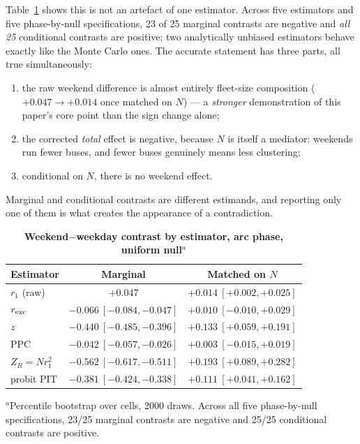 \documentclass[9pt,twocolumn,twoside]{opticajnl}
\begin{document}
Table~\ref{tab:contrasts} shows this is not an artefact of one estimator. Across five estimators
and five phase-by-null specifications, 23 of 25 marginal contrasts are negative and \emph{all
25} conditional contrasts are positive; two analytically unbiased estimators behave exactly like
the Monte Carlo ones. The accurate statement has three parts, all true simultaneously:
\begin{enumerate}\itemsep0pt
\item the raw weekend difference is almost entirely fleet-size composition ($+0.047 \to +0.014$
      once matched on $N$) --- a \emph{stronger} demonstration of this paper's core point than
      the sign change alone;
\item the corrected \emph{total} effect is negative, because $N$ is itself a mediator: weekends
      run fewer buses, and fewer buses genuinely means less clustering;
\item conditional on $N$, there is no weekend effect.
\end{enumerate}
Marginal and conditional contrasts are different estimands, and reporting only one of them is
what creates the appearance of a contradiction.

\begin{table}[t]
\centering
\caption{\bf Weekend$-$weekday contrast by estimator, arc phase, uniform null$^{a}$}
\small
\setlength{\tabcolsep}{3.2pt}
\begin{tabular}{lcc}
\toprule
Estimator & Marginal & Matched on $N$ \\
\midrule
$r_1$ (raw)          & $+0.047$ & $+0.014\ [+0.002,+0.025]$ \\
$r_{\rm exc}$        & $-0.066\ [-0.084,-0.047]$ & $+0.010\ [-0.010,+0.029]$ \\
$z$                  & $-0.440\ [-0.485,-0.396]$ & $+0.133\ [+0.059,+0.191]$ \\
PPC                  & $-0.042\ [-0.057,-0.026]$ & $+0.003\ [-0.015,+0.019]$ \\
$Z_R = Nr_1^2$       & $-0.562\ [-0.617,-0.511]$ & $+0.193\ [+0.089,+0.282]$ \\
probit PIT           & $-0.381\ [-0.424,-0.338]$ & $+0.111\ [+0.041,+0.162]$ \\
\bottomrule
\end{tabular}
\label{tab:contrasts}

\smallskip
$^{a}$Percentile bootstrap over cells, 2000 draws. Across all five phase-by-null
specifications, 23/25 marginal contrasts are negative and 25/25 conditional contrasts are
positive.
\end{table}
\end{document}
